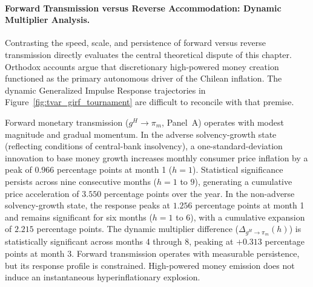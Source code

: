\paragraph{Forward Transmission versus Reverse Accommodation: Dynamic Multiplier Analysis.}
Contrasting the speed, scale, and persistence of forward versus reverse transmission directly evaluates the central theoretical dispute of this chapter. Orthodox accounts \citep{DornbuschEdwards1990,Edwards2024} argue that discretionary high-powered money creation functioned as the primary autonomous driver of the Chilean inflation. The dynamic Generalized Impulse Response trajectories in Figure~\ref{fig:tvar_girf_tournament} are difficult to reconcile with that premise. 

Forward monetary transmission ($g^H \to \pi_m$, Panel~A) operates with modest magnitude and gradual momentum. In the adverse solvency-growth state (reflecting conditions of central-bank insolvency), a one-standard-deviation innovation to base money growth increases monthly consumer price inflation by a peak of $0.966$ percentage points at month 1 ($h=1$). Statistical significance persists across nine consecutive months ($h=1$ to $9$), generating a cumulative price acceleration of $3.550$ percentage points over the year. In the non-adverse solvency-growth state, the response peaks at $1.256$ percentage points at month 1 and remains significant for six months ($h=1$ to $6$), with a cumulative expansion of $2.215$ percentage points. The dynamic multiplier difference ($\Delta_{g^H \to \pi_m}(h)$) is statistically significant across months 4 through 8, peaking at $+0.313$ percentage points at month 3. Forward transmission operates with measurable persistence, but its response profile is constrained. High-powered money emission does not induce an instantaneous hyperinflationary explosion.

